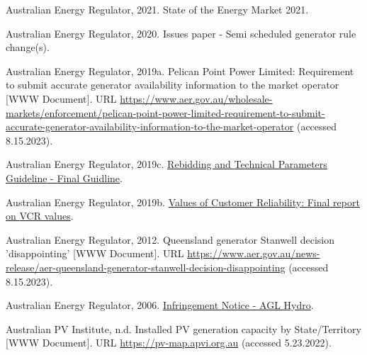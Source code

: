 \documentclass[12pt,a4paper,]{report}
\newlength{\cslhangindent}
\newenvironment{CSLReferences}[2] %
 {%
  \setlength{\parindent}{0pt}
  \ifodd #1 \everypar{\setlength{\hangindent}{\cslhangindent}}\ignorespaces\fi
  \ifnum #2 > 0
  \setlength{\parskip}{#2\baselineskip}
  \fi
 }%
 {}
\begin{document}
\begin{CSLReferences}{1}{0}
\leavevmode{}%
Australian Energy Regulator, 2021. State of the {Energy Market} 2021.

\leavevmode{}%
Australian Energy Regulator, 2020. Issues paper - {Semi} scheduled
generator rule change(s).

\leavevmode{}%
Australian Energy Regulator, 2019a. Pelican {Point Power Limited}:
Requirement to submit accurate generator availability information to the
market operator {[}WWW Document{]}. URL
\url{https://www.aer.gov.au/wholesale-markets/enforcement/pelican-point-power-limited-requirement-to-submit-accurate-generator-availability-information-to-the-market-operator}
(accessed 8.15.2023).

\leavevmode{}%
Australian Energy Regulator, 2019c.
\href{https://www.aer.gov.au/system/files/For\%20publish\%20-\%20Rebidding\%20and\%20technical\%20parameters\%20guideline\%20-\%20final\%20guideline\%20\%282019\%20amendments\%29.pdf}{Rebidding
and {Technical Parameters Guideline} - {Final Guidline}}.

\leavevmode{}%
Australian Energy Regulator, 2019b.
\href{https://www.aer.gov.au/system/files/AER\%20-\%20Values\%20of\%20Customer\%20Reliability\%20Review\%20-\%20Final\%20Report\%20-\%20December\%202019.pdf}{Values
of {Customer Reliability}: {Final} report on {VCR} values}.

\leavevmode{}%
Australian Energy Regulator, 2012. Queensland generator {Stanwell}
decision 'disappointing' {[}WWW Document{]}. URL
\url{https://www.aer.gov.au/news-release/aer-queensland-generator-stanwell-decision-disappointing}
(accessed 8.15.2023).

\leavevmode{}%
Australian Energy Regulator, 2006.
\href{https://www.aer.gov.au/system/files/AGL\%20Infringement\%20Notice.pdf}{Infringement
{Notice} - {AGL Hydro}}.

\leavevmode{}%
Australian PV Institute, n.d. Installed {PV} generation capacity by
{State}/{Territory} {[}WWW Document{]}. URL
\url{https://pv-map.apvi.org.au} (accessed 5.23.2022).


\end{CSLReferences}
\end{document}
